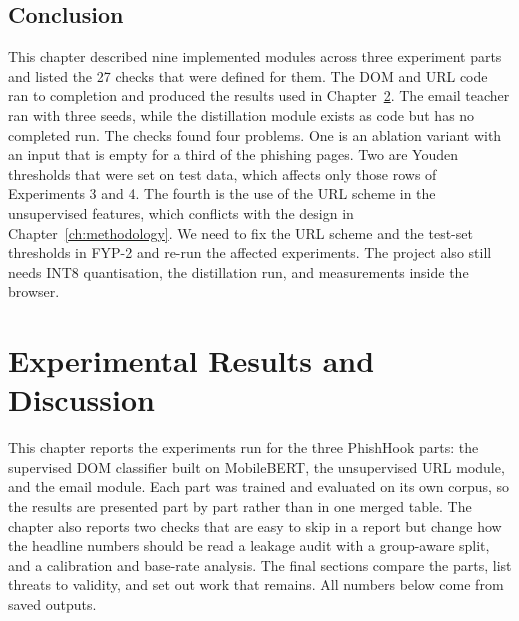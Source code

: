 \documentclass{FastFyp}
\begin{document}
\section{Conclusion}
\label{sec:impl-conclusion}
This chapter described nine implemented modules across three experiment parts and listed the 27 checks that were defined for them. The DOM and URL code ran to completion and produced the results used in Chapter~\ref{ch:results}. The email teacher ran with three seeds, while the distillation module exists as code but has no completed run. The checks found four problems. One is an ablation variant with an input that is empty for a third of the phishing pages. Two are Youden thresholds that were set on test data, which affects only those rows of Experiments 3 and 4. The fourth is the use of the URL scheme in the unsupervised features, which conflicts with the design in Chapter~\ref{ch:methodology}. We need to fix the URL scheme and the test-set thresholds in FYP-2 and re-run the affected experiments. The project also still needs INT8 quantisation, the distillation run, and measurements inside the browser.
























\graphicspath{{figures/}{./}}
\setcounter{chapter}{8}
\chapter{Experimental Results and Discussion}
\label{ch:results}

This chapter reports the experiments run for the three PhishHook parts: the supervised DOM classifier built on MobileBERT, the unsupervised URL module, and the email module. Each part was trained and evaluated on its own corpus, so the results are presented part by part rather than in one merged table. The chapter also reports two checks that are easy to skip in a report but change how the headline numbers should be read a leakage audit with a group-aware split, and a calibration and base-rate analysis. The final sections compare the parts, list threats to validity, and set out work that remains. All numbers below come from saved outputs.
\end{document}

